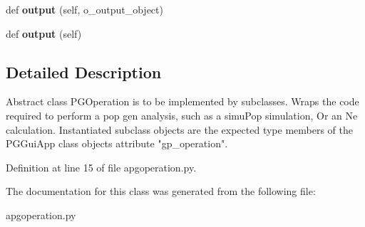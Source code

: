 \begin{DoxyCompactItemize}
\item 
def {\bfseries output} (self, o\+\_\+output\+\_\+object)\hypertarget{classnegui_1_1apgoperation_1_1APGOperation_a92751ec3a6053de0e8638df3d1b122ff}{}\label{classnegui_1_1apgoperation_1_1APGOperation_a92751ec3a6053de0e8638df3d1b122ff}

\item 
def {\bfseries output} (self)\hypertarget{classnegui_1_1apgoperation_1_1APGOperation_a70a4663961a30ab0405701072c78f759}{}\label{classnegui_1_1apgoperation_1_1APGOperation_a70a4663961a30ab0405701072c78f759}

\end{DoxyCompactItemize}


\subsection{Detailed Description}
\begin{DoxyVerb}Abstract class PGOperation is to be implemented by subclasses.
Wraps the code required to perform a pop gen analysis, such as a simuPop simulation,
Or an Ne calculation.  Instantiated subclass objects are the expected type members 
of the PGGuiApp class objects attribute "gp_operation".
\end{DoxyVerb}
 

Definition at line 15 of file apgoperation.\+py.



The documentation for this class was generated from the following file\+:\begin{DoxyCompactItemize}
\item 
apgoperation.\+py\end{DoxyCompactItemize}
